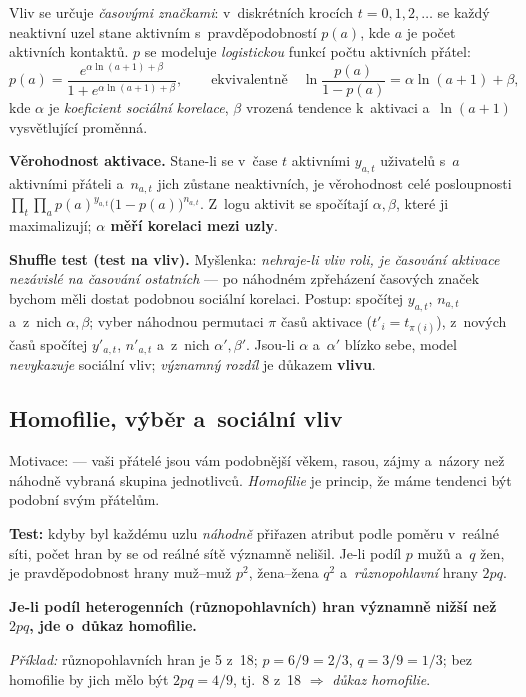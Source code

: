 \documentclass[11pt,a4paper]{article}
\theoremstyle{definition}
\begin{document}
\begin{defbox}
Vliv se určuje \emph{časovými značkami}: v~diskrétních krocích $t=0,1,2,\dots$ se každý neaktivní
uzel stane aktivním s~pravděpodobností $p(a)$, kde $a$ je počet aktivních kontaktů. $p$ se
modeluje \emph{logistickou} funkcí počtu aktivních přátel:
\[ p(a)=\frac{e^{\alpha\ln(a+1)+\beta}}{1+e^{\alpha\ln(a+1)+\beta}},\qquad\text{ekvivalentně}\quad
   \ln\frac{p(a)}{1-p(a)}=\alpha\ln(a+1)+\beta, \]
kde $\alpha$ je \emph{koeficient sociální korelace}, $\beta$ vrozená tendence k~aktivaci
a~$\ln(a+1)$ vysvětlující proměnná.

\textbf{Věrohodnost aktivace.} Stane-li se v~čase $t$ aktivními $y_{a,t}$ uživatelů s~$a$
aktivními přáteli a~$n_{a,t}$ jich zůstane neaktivních, je věrohodnost celé posloupnosti
$\prod_t\prod_a p(a)^{y_{a,t}}\big(1-p(a)\big)^{n_{a,t}}$. Z~logu aktivit se spočítají
$\alpha,\beta$, které ji maximalizují; \textbf{$\alpha$ měří korelaci mezi uzly}.

\textbf{Shuffle test (test na vliv).} Myšlenka: \emph{nehraje-li vliv roli, je časování aktivace
nezávislé na časování ostatních} --- po náhodném zpřeházení časových značek bychom měli dostat
podobnou sociální korelaci. Postup: spočítej $y_{a,t}$, $n_{a,t}$ a~z~nich $\alpha,\beta$;
vyber náhodnou permutaci $\pi$ časů aktivace ($t'_i=t_{\pi(i)}$), z~nových časů spočítej
$y'_{a,t}$, $n'_{a,t}$ a~z~nich $\alpha',\beta'$. Jsou-li $\alpha$ a~$\alpha'$ blízko sebe,
model \emph{nevykazuje} sociální vliv; \emph{významný rozdíl} je důkazem \textbf{vlivu}.
\end{defbox}

\subsection{Homofilie, výběr a~sociální vliv}

\begin{defbox}
Motivace:  --- vaši přátelé jsou vám podobnější věkem, rasou, zájmy
a~názory než náhodně vybraná skupina jednotlivců. \emph{Homofilie} je princip, že máme tendenci
být podobní svým přátelům.

\textbf{Test:} kdyby byl každému uzlu \emph{náhodně} přiřazen atribut podle poměru v~reálné
síti, počet  hran by se od reálné sítě významně nelišil. Je-li podíl $p$ mužů
a~$q$ žen, je pravděpodobnost hrany muž--muž $p^2$, žena--žena $q^2$ a~\emph{různopohlavní}
hrany $2pq$.

\textbf{Je-li podíl heterogenních (různopohlavních) hran významně nižší než $2pq$, jde
o~důkaz homofilie.}

\emph{Příklad:} různopohlavních hran je 5 z~18; $p=6/9=2/3$, $q=3/9=1/3$; bez homofilie by
jich mělo být $2pq=4/9$, tj.\ 8 z~18 $\Rightarrow$ \emph{důkaz homofilie}.
\end{defbox}
\end{document}
